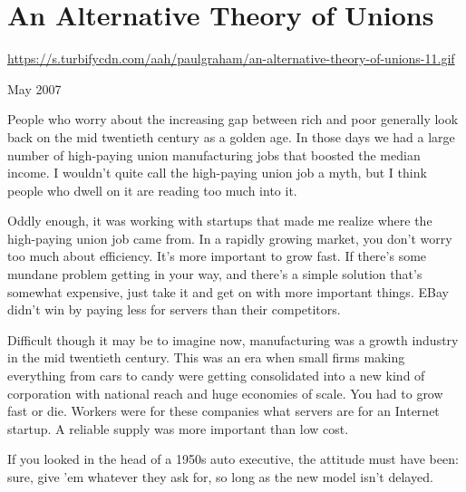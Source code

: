 \chapter{An Alternative Theory of Unions}


            
              
                \href{https://s.turbifycdn.com/aah/paulgraham/an-alternative-theory-of-unions-11.gif}{https://s.turbifycdn.com/aah/paulgraham/an-alternative-theory-of-unions-11.gif}



May 2007

People who worry about the increasing gap
                  between rich and poor generally look back on the mid twentieth
                  century as a golden age. In those days we had a large number
                  of high-paying union manufacturing jobs that boosted the
                  median income. I wouldn't quite call the high-paying union job
                  a myth, but I think people who dwell on it are reading too
                  much into it.

Oddly enough, it was working with
                  startups that made me realize where the high-paying union job
                  came from. In a rapidly growing market, you don't worry too
                  much about efficiency. It's more important to grow fast. If
                  there's some mundane problem getting in your way, and there's
                  a simple solution that's somewhat expensive, just take it and
                  get on with more important things. EBay didn't win by paying
                  less for servers than their competitors.

Difficult
                  though it may be to imagine now, manufacturing was a growth
                  industry in the mid twentieth century. This was an era when
                  small firms making everything from cars to candy were getting
                  consolidated into a new kind of corporation with national
                  reach and huge economies of scale. You had to grow fast or
                  die. Workers were for these companies what servers are for an
                  Internet startup. A reliable supply was more important than
                  low cost.

If you looked in the head of a 1950s auto
                  executive, the attitude must have been: sure, give 'em
                  whatever they ask for, so long as the new model isn't
                  delayed.

